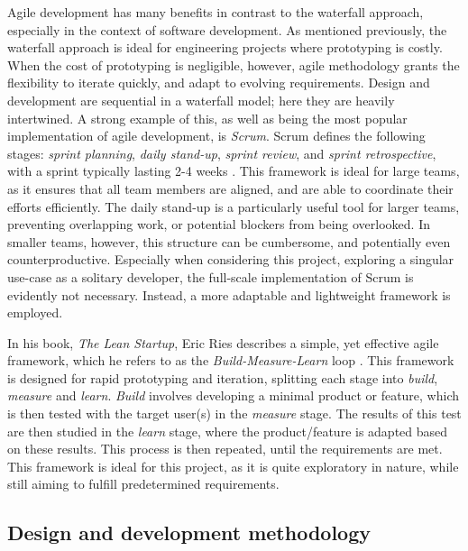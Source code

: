 Agile development has many benefits in contrast to the waterfall approach, especially in the context of software development. As mentioned previously, the waterfall approach is ideal for engineering projects where prototyping is costly. When the cost of prototyping is negligible, however, agile methodology grants the flexibility to iterate quickly, and adapt to evolving requirements. Design and development are sequential in a waterfall model; here they are heavily intertwined. A strong example of this, as well as being the most popular implementation of agile development, is \textit{Scrum}. Scrum defines the following stages: \textit{sprint planning}, \textit{daily stand-up}, \textit{sprint review}, and \textit{sprint retrospective}, with a sprint typically lasting 2-4 weeks \cite{scrum}. This framework is ideal for large teams, as it ensures that all team members are aligned, and are able to coordinate their efforts efficiently. The daily stand-up is a particularly useful tool for larger teams, preventing overlapping work, or potential blockers from being overlooked. In smaller teams, however, this structure can be cumbersome, and potentially even counterproductive. Especially when considering this project, exploring a singular use-case as a solitary developer, the full-scale implementation of Scrum is evidently not necessary. Instead, a more adaptable and lightweight framework is employed.

In his book, \textit{The Lean Startup}, Eric Ries describes a simple, yet effective agile framework, which he refers to as the \textit{Build-Measure-Learn} loop \cite{lean_startup}. This framework is designed for rapid prototyping and iteration, splitting each stage into \textit{build}, \textit{measure} and \textit{learn}. \textit{Build} involves developing a minimal product or feature, which is then tested with the target user(s) in the \textit{measure} stage. The results of this test are then studied in the \textit{learn} stage, where the product/feature is adapted based on these results. This process is then repeated, until the requirements are met. This framework is ideal for this project, as it is quite exploratory in nature, while still aiming to fulfill predetermined requirements.

\subsection{Design and development methodology}

